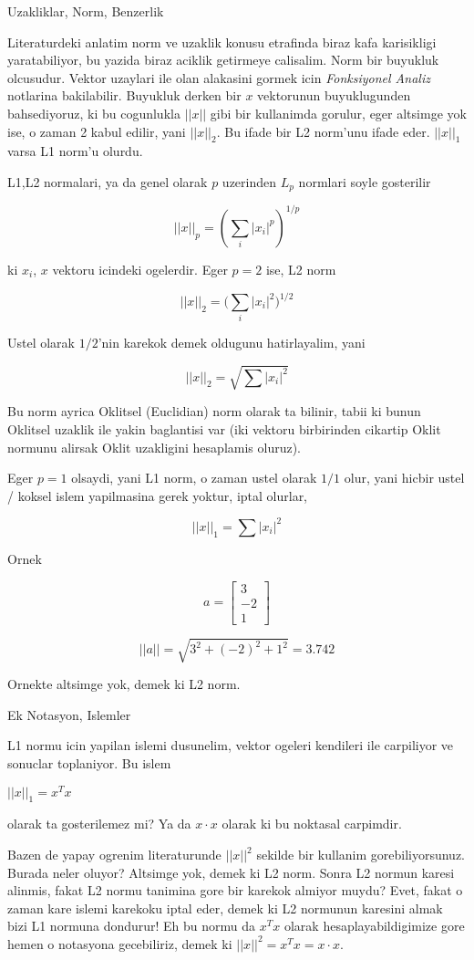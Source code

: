 \documentclass[12pt,fleqn]{article}\usepackage{../common}
\begin{document}
Uzakliklar, Norm, Benzerlik

Literaturdeki anlatim norm ve uzaklik konusu etrafinda biraz kafa
karisikligi yaratabiliyor, bu yazida biraz aciklik getirmeye
calisalim. Norm bir buyukluk olcusudur. Vektor uzaylari ile olan alakasini
gormek icin {\em Fonksiyonel Analiz} notlarina bakilabilir. Buyukluk derken
bir $x$ vektorunun buyuklugunden bahsediyoruz, ki bu cogunlukla $||x||$
gibi bir kullanimda gorulur, eger altsimge yok ise, o zaman 2 kabul edilir,
yani $||x||_2$. Bu ifade bir L2 norm'unu ifade eder. $||x||_1$ varsa L1
norm'u olurdu.

L1,L2 normalari, ya da genel olarak $p$ uzerinden $L_p$ normlari soyle gosterilir

$$ ||x||_p = (\sum_i |x_i|^p)^{1/p} $$

ki $x_i$, $x$ vektoru icindeki ogelerdir. Eger $p=2$ ise, L2 norm

$$ ||x||_2 = \bigg(\sum_i |x_i|^2 \bigg)^{1/2} $$

Ustel olarak $1/2$'nin karekok demek oldugunu hatirlayalim, yani 

$$ ||x||_2 = \sqrt{\sum |x_i|^2} $$

Bu norm ayrica Oklitsel (Euclidian) norm olarak ta bilinir, tabii ki bunun
Oklitsel uzaklik ile yakin baglantisi var (iki vektoru birbirinden cikartip
Oklit normunu alirsak Oklit uzakligini hesaplamis oluruz).

Eger $p=1$ olsaydi, yani L1 norm, o zaman ustel olarak $1/1$ olur, yani
hicbir ustel / koksel islem yapilmasina gerek yoktur, iptal olurlar,

$$ ||x||_1 = \sum |x_i|^2 $$


Ornek

$$ 
a = \left[\begin{array}{r}
3 \\ -2 \\ 1
\end{array}\right]
 $$

$$ ||a|| = \sqrt{3^2+(-2)^2+1^2} = 3.742 $$

Ornekte altsimge yok, demek ki L2 norm. 

Ek Notasyon, Islemler

L1 normu icin yapilan islemi dusunelim, vektor ogeleri kendileri ile
carpiliyor ve sonuclar toplaniyor. Bu islem

$||x||_1 = x^Tx$

olarak ta gosterilemez mi? Ya da $x \cdot x$ olarak ki bu noktasal carpimdir.

Bazen de yapay ogrenim literaturunde $||x||^2$ sekilde bir kullanim
gorebiliyorsunuz. Burada neler oluyor? Altsimge yok, demek ki L2
norm. Sonra L2 normun karesi alinmis, fakat L2 normu tanimina gore bir
karekok almiyor muydu? Evet, fakat o zaman kare islemi karekoku iptal eder,
demek ki L2 normunun karesini almak bizi L1 normuna dondurur! Eh bu normu
da $x^Tx$ olarak hesaplayabildigimize gore hemen o notasyona gecebiliriz,
demek ki $||x||^2 = x^Tx = x \cdot x$. 
\end{document}
